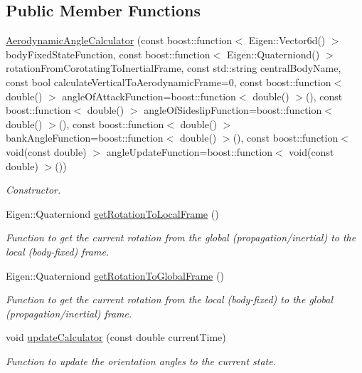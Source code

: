 \subsection*{Public Member Functions}
\begin{DoxyCompactItemize}
\item 
\hyperlink{classtudat_1_1reference__frames_1_1AerodynamicAngleCalculator_a191c7666c72fc3fdb68f888fd33700cc}{Aerodynamic\+Angle\+Calculator} (const boost\+::function$<$ Eigen\+::\+Vector6d() $>$ body\+Fixed\+State\+Function, const boost\+::function$<$ Eigen\+::\+Quaterniond() $>$ rotation\+From\+Corotating\+To\+Inertial\+Frame, const std\+::string central\+Body\+Name, const bool calculate\+Vertical\+To\+Aerodynamic\+Frame=0, const boost\+::function$<$ double() $>$ angle\+Of\+Attack\+Function=boost\+::function$<$ double() $>$(), const boost\+::function$<$ double() $>$ angle\+Of\+Sideslip\+Function=boost\+::function$<$ double() $>$(), const boost\+::function$<$ double() $>$ bank\+Angle\+Function=boost\+::function$<$ double() $>$(), const boost\+::function$<$ void(const double) $>$ angle\+Update\+Function=boost\+::function$<$ void(const double) $>$())
\begin{DoxyCompactList}\small\item\em Constructor. \end{DoxyCompactList}\item 
Eigen\+::\+Quaterniond \hyperlink{classtudat_1_1reference__frames_1_1AerodynamicAngleCalculator_ae8de3add4e5d89be447eb707f17fbd13}{get\+Rotation\+To\+Local\+Frame} ()
\begin{DoxyCompactList}\small\item\em Function to get the current rotation from the global (propagation/inertial) to the local (body-\/fixed) frame. \end{DoxyCompactList}\item 
Eigen\+::\+Quaterniond \hyperlink{classtudat_1_1reference__frames_1_1AerodynamicAngleCalculator_ae7b951843ce6578117c64db9c7a54720}{get\+Rotation\+To\+Global\+Frame} ()
\begin{DoxyCompactList}\small\item\em Function to get the current rotation from the local (body-\/fixed) to the global (propagation/inertial) frame. \end{DoxyCompactList}\item 
void \hyperlink{classtudat_1_1reference__frames_1_1AerodynamicAngleCalculator_aceb968e26cbe6d3f40590c4f7faeba21}{update\+Calculator} (const double current\+Time)
\begin{DoxyCompactList}\small\item\em Function to update the orientation angles to the current state. \end{DoxyCompactList}\item 

\end{DoxyCompactItemize}
